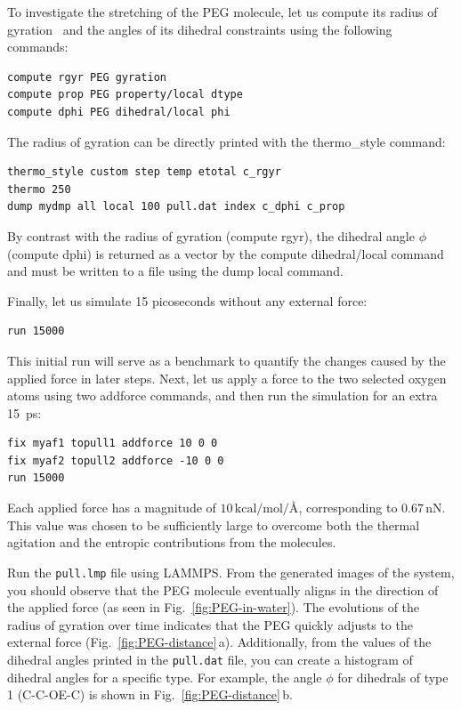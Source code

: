 \documentclass[9pt,tutorial]{livecoms}
\newcommand{\lmpcmd}[1]{\hspace{0pt}\colorbox{listing}{\textcolor{command}{\small{#1}}}\hspace{0pt}} %
\newcommand{\flecmd}[1]{\textcolor{command}{\texttt{#1}}} %
\begin{document}
To investigate the stretching of the PEG molecule, let us compute its radius of
gyration~\cite{fixmanRadiusGyrationPolymer1962a} and the angles of its dihedral
constraints using the following commands:
\begin{lstlisting}
compute rgyr PEG gyration
compute prop PEG property/local dtype
compute dphi PEG dihedral/local phi
\end{lstlisting}
The radius of gyration can be directly printed with the \lmpcmd{thermo\_style} command:
\begin{lstlisting}
thermo_style custom step temp etotal c_rgyr
thermo 250
dump mydmp all local 100 pull.dat index c_dphi c_prop
\end{lstlisting}
By contrast with the radius of gyration (compute \lmpcmd{rgyr}), the dihedral angle  %
$\phi$ (compute \lmpcmd{dphi}) is returned as a vector by the \lmpcmd{compute dihedral/local} 
command and must be written to a file using the \lmpcmd{dump local} command.

Finally, let us simulate 15 picoseconds without any external force:
\begin{lstlisting}
run 15000
\end{lstlisting}
This initial run will serve as a benchmark to quantify the changes caused by
the applied force in later steps.  Next, let us apply a force to the two selected
oxygen atoms using two \lmpcmd{addforce} commands, and then run the simulation
for an extra 15~ps:
\begin{lstlisting}
fix myaf1 topull1 addforce 10 0 0
fix myaf2 topull2 addforce -10 0 0
run 15000
\end{lstlisting}
Each applied force has a magnitude of $10\,\text{kcal/mol/\AA{}}$, corresponding to $0.67\,\text{nN}$.
This value was chosen to be sufficiently large to overcome both the thermal agitation and
the entropic contributions from the molecules.

Run the \flecmd{pull.lmp} file using LAMMPS.  From the generated images of the system,
you should observe that the PEG molecule eventually aligns
in the direction of the applied force (as seen in Fig.~\ref{fig:PEG-in-water}).
The evolutions of the radius of gyration over
time indicates that the PEG quickly adjusts to the external force
(Fig.~\ref{fig:PEG-distance}\,a).  Additionally, from the values of the dihedral angles
printed in the \flecmd{pull.dat} file, you can create a histogram
of dihedral angles for a specific type.  For example, the angle $\phi$ for dihedrals
of type 1 (C-C-OE-C) is shown in Fig.~\ref{fig:PEG-distance}\,b.
\end{document}
